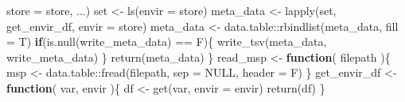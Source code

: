 \documentclass[
]{article}
\newenvironment{Shaded}{\begin{snugshade}}{\end{snugshade}}
\newcommand{\AttributeTok}[1]{\textcolor[rgb]{0.77,0.63,0.00}{#1}}
\newcommand{\ConstantTok}[1]{\textcolor[rgb]{0.00,0.00,0.00}{#1}}
\newcommand{\ControlFlowTok}[1]{\textcolor[rgb]{0.13,0.29,0.53}{\textbf{#1}}}
\newcommand{\FunctionTok}[1]{\textcolor[rgb]{0.00,0.00,0.00}{#1}}
\newcommand{\NormalTok}[1]{#1}
\newcommand{\OtherTok}[1]{\textcolor[rgb]{0.56,0.35,0.01}{#1}}
\newcommand{\SpecialCharTok}[1]{\textcolor[rgb]{0.00,0.00,0.00}{#1}}
\begin{document}
\begin{Shaded}
\begin{Highlighting}[]
      \AttributeTok{store =}\NormalTok{ store,}
\NormalTok{      ...)}
\NormalTok{    set }\OtherTok{\textless{}{-}} \FunctionTok{ls}\NormalTok{(}\AttributeTok{envir =}\NormalTok{ store)}
\NormalTok{    meta\_data }\OtherTok{\textless{}{-}} \FunctionTok{lapply}\NormalTok{(set, get\_envir\_df,}
      \AttributeTok{envir =}\NormalTok{ store)}
\NormalTok{    meta\_data }\OtherTok{\textless{}{-}}\NormalTok{ data.table}\SpecialCharTok{::}\FunctionTok{rbindlist}\NormalTok{(meta\_data, }\AttributeTok{fill =}\NormalTok{ T)}
    \ControlFlowTok{if}\NormalTok{(}\FunctionTok{is.null}\NormalTok{(write\_meta\_data) }\SpecialCharTok{==}\NormalTok{ F)\{}
      \FunctionTok{write\_tsv}\NormalTok{(meta\_data, write\_meta\_data)}
\NormalTok{    \}}
    \FunctionTok{return}\NormalTok{(meta\_data)}
\NormalTok{  \}}
\NormalTok{read\_msp }\OtherTok{\textless{}{-}}
  \ControlFlowTok{function}\NormalTok{(}
\NormalTok{    filepath}
\NormalTok{    )\{}
\NormalTok{    msp }\OtherTok{\textless{}{-}}\NormalTok{ data.table}\SpecialCharTok{::}\FunctionTok{fread}\NormalTok{(filepath, }\AttributeTok{sep =} \ConstantTok{NULL}\NormalTok{, }\AttributeTok{header =}\NormalTok{ F)}
\NormalTok{  \}}
\NormalTok{get\_envir\_df }\OtherTok{\textless{}{-}}
  \ControlFlowTok{function}\NormalTok{(}
\NormalTok{    var,}
\NormalTok{    envir}
\NormalTok{    )\{}
\NormalTok{    df }\OtherTok{\textless{}{-}} \FunctionTok{get}\NormalTok{(var, }\AttributeTok{envir =}\NormalTok{ envir)}
    \FunctionTok{return}\NormalTok{(df)}
\NormalTok{  \}}


\end{Highlighting}
\end{Shaded}
\end{document}
